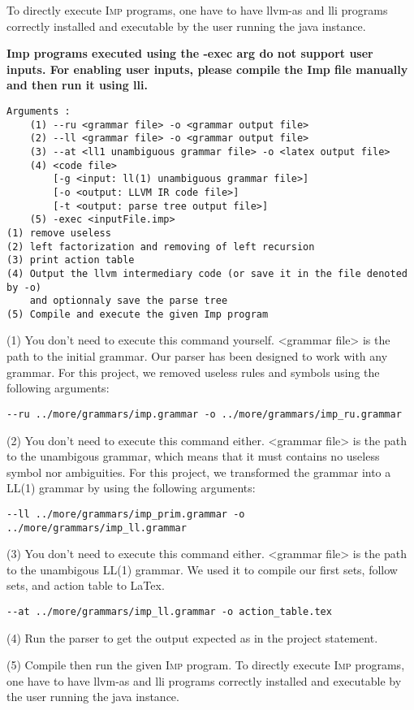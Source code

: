 \documentclass[11pt]{article}
\newcommand\imp{\textsc{Imp}\xspace}
\begin{document}
To directly execute \imp programs, one have to have \textsf{llvm-as} and \textsf{lli} programs correctly installed and
executable by the user running the java instance.

\textbf{Imp programs executed using the -exec arg do not support user inputs. For enabling user inputs, 
please compile the Imp file manually and then run it using lli.}

{\small
\begin{lstlisting}
Arguments :
    (1) --ru <grammar file> -o <grammar output file>
    (2) --ll <grammar file> -o <grammar output file>
    (3) --at <ll1 unambiguous grammar file> -o <latex output file>
    (4) <code file>
        [-g <input: ll(1) unambiguous grammar file>]
        [-o <output: LLVM IR code file>]
        [-t <output: parse tree output file>]
    (5) -exec <inputFile.imp>
(1) remove useless
(2) left factorization and removing of left recursion
(3) print action table
(4) Output the llvm intermediary code (or save it in the file denoted by -o)
    and optionnaly save the parse tree
(5) Compile and execute the given Imp program
\end{lstlisting}}

(1) You don't need to execute this command yourself. <grammar file> is the path to the initial grammar.
Our parser has been designed to work with any grammar. For this project, we removed useless rules and symbols
using the following arguments:
\begin{lstlisting}
--ru ../more/grammars/imp.grammar -o ../more/grammars/imp_ru.grammar
\end{lstlisting}

(2) You don't need to execute this command either. <grammar file> is the path to the unambigous grammar, which
means that it must contains no useless symbol nor ambiguities.
For this project, we transformed the grammar into a LL(1) grammar by using the following arguments:
\begin{lstlisting}
--ll ../more/grammars/imp_prim.grammar -o ../more/grammars/imp_ll.grammar
\end{lstlisting}

(3) You don't need to execute this command either. <grammar file> is the path to the unambigous LL(1) grammar.
We used it to compile our first sets, follow sets, and action table to LaTex.
\begin{lstlisting}
--at ../more/grammars/imp_ll.grammar -o action_table.tex
\end{lstlisting}

(4) Run the parser to get the output expected as in the project statement.

(5) Compile then run the given \imp program.
To directly execute \imp programs, one have to have \textsf{llvm-as} and \textsf{lli} programs correctly installed and
executable by the user running the java instance.
\end{document}
